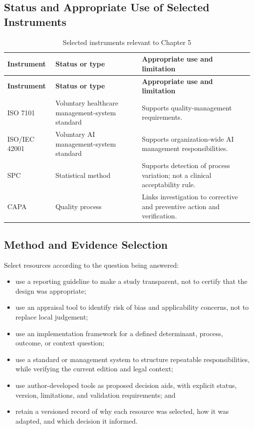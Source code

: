 \subsection{Status and Appropriate Use of Selected Instruments}
\begin{longtable}{@{}p{}p{}p{}@{}}
\caption{Selected instruments relevant to Chapter 5}
\label{tab:comp-ch05-instrument-status}\\
\toprule
\textbf{Instrument} & \textbf{Status or type} & \textbf{Appropriate use and limitation} \\
\midrule
\endfirsthead
\toprule
\textbf{Instrument} & \textbf{Status or type} & \textbf{Appropriate use and limitation} \\
\midrule
\endhead
\bottomrule
\endlastfoot
ISO 7101 & Voluntary healthcare management-system standard & Supports quality-management requirements. \\
ISO/IEC 42001 & Voluntary AI management-system standard & Supports organization-wide AI management responsibilities. \\
SPC & Statistical method & Supports detection of process variation; not a clinical acceptability rule. \\
CAPA & Quality process & Links investigation to corrective and preventive action and verification. \\
\end{longtable}

\subsection{Method and Evidence Selection}
Select resources according to the question being answered:
\begin{itemize}
 \item use a reporting guideline to make a study transparent, not to certify that the design was appropriate;
 \item use an appraisal tool to identify risk of bias and applicability concerns, not to replace local judgement;
 \item use an implementation framework for a defined determinant, process, outcome, or context question;
 \item use a standard or management system to structure repeatable responsibilities, while verifying the current edition and legal context;
 \item use author-developed tools as proposed decision aids, with explicit status, version, limitations, and validation requirements; and
 \item retain a versioned record of why each resource was selected, how it was adapted, and which decision it informed.
\end{itemize}

